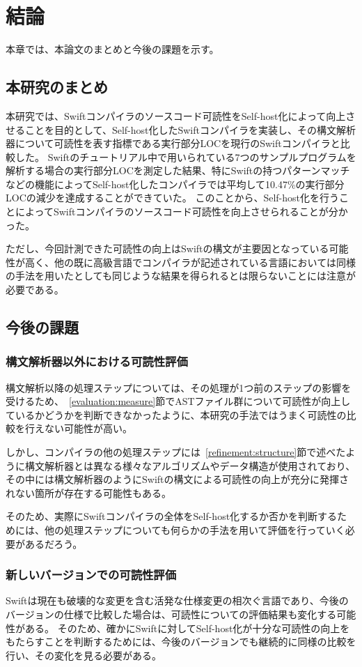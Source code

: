 \chapter{結論}
\label{conclusion}

本章では、本論文のまとめと今後の課題を示す。

\section{本研究のまとめ}

本研究では、Swiftコンパイラのソースコード可読性をSelf-host化によって向上させることを目的として、Self-host化したSwiftコンパイラを実装し、その構文解析器について可読性を表す指標である実行部分LOCを現行のSwiftコンパイラと比較した。
Swiftのチュートリアル中で用いられている7つのサンプルプログラムを解析する場合の実行部分LOCを測定した結果、特にSwiftの持つパターンマッチなどの機能によってSelf-host化したコンパイラでは平均して10.47\%の実行部分LOCの減少を達成することができていた。
このことから、Self-host化を行うことによってSwiftコンパイラのソースコード可読性を向上させられることが分かった。

ただし、今回計測できた可読性の向上はSwiftの構文が主要因となっている可能性が高く、他の既に高級言語でコンパイラが記述されている言語においては同様の手法を用いたとしても同じような結果を得られるとは限らないことには注意が必要である。

\section{今後の課題}

\subsection{構文解析器以外における可読性評価}

構文解析以降の処理ステップについては、その処理が1つ前のステップの影響を受けるため、~\ref{evaluation:measure}節でASTファイル群について可読性が向上しているかどうかを判断できなかったように、本研究の手法ではうまく可読性の比較を行えない可能性が高い。

しかし、コンパイラの他の処理ステップには~\ref{refinement:structure}節で述べたように構文解析器とは異なる様々なアルゴリズムやデータ構造が使用されており、その中には構文解析器のようにSwiftの構文による可読性の向上が充分に発揮されない箇所が存在する可能性もある。

そのため、実際にSwiftコンパイラの全体をSelf-host化するか否かを判断するためには、他の処理ステップについても何らかの手法を用いて評価を行っていく必要があるだろう。

\subsection{新しいバージョンでの可読性評価}

Swiftは現在も破壊的な変更を含む活発な仕様変更の相次ぐ言語であり、今後のバージョンの仕様で比較した場合は、可読性についての評価結果も変化する可能性がある。
そのため、確かにSwiftに対してSelf-host化が十分な可読性の向上をもたらすことを判断するためには、今後のバージョンでも継続的に同様の比較を行い、その変化を見る必要がある。

